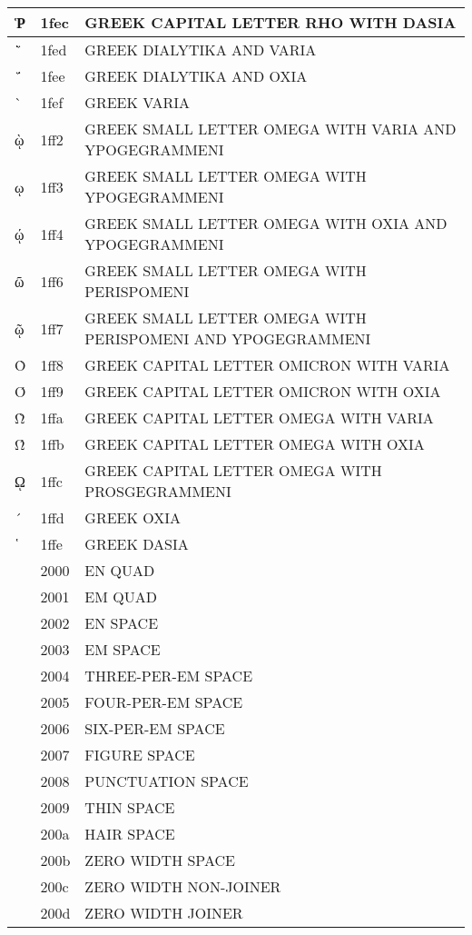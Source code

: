 \documentclass[12pt,letterpaper,openany]{book}
\begin{document}
\begin{center}
\begin{supertabular}{|m{0.25in}|m{0.5in}|m{4in}|}
			Ῥ & 1fec & GREEK CAPITAL LETTER RHO WITH DASIA\\\hline
			῭ & 1fed & GREEK DIALYTIKA AND VARIA\\\hline
			΅ & 1fee & GREEK DIALYTIKA AND OXIA\\\hline
			` & 1fef & GREEK VARIA\\\hline
			ῲ & 1ff2 & GREEK SMALL LETTER OMEGA WITH VARIA AND YPOGEGRAMMENI\\\hline
			ῳ & 1ff3 & GREEK SMALL LETTER OMEGA WITH YPOGEGRAMMENI\\\hline
			ῴ & 1ff4 & GREEK SMALL LETTER OMEGA WITH OXIA AND YPOGEGRAMMENI\\\hline
			ῶ & 1ff6 & GREEK SMALL LETTER OMEGA WITH PERISPOMENI\\\hline
			ῷ & 1ff7 & GREEK SMALL LETTER OMEGA WITH PERISPOMENI AND YPOGEGRAMMENI\\\hline
			Ὸ & 1ff8 & GREEK CAPITAL LETTER OMICRON WITH VARIA\\\hline
			Ό & 1ff9 & GREEK CAPITAL LETTER OMICRON WITH OXIA\\\hline
			Ὼ & 1ffa & GREEK CAPITAL LETTER OMEGA WITH VARIA\\\hline
			Ώ & 1ffb & GREEK CAPITAL LETTER OMEGA WITH OXIA\\\hline
			ῼ & 1ffc & GREEK CAPITAL LETTER OMEGA WITH PROSGEGRAMMENI\\\hline
			´ & 1ffd & GREEK OXIA\\\hline
			῾ & 1ffe & GREEK DASIA\\\hline
			& 2000 & EN QUAD\\\hline
			& 2001 & EM QUAD\\\hline
			& 2002 & EN SPACE\\\hline
			& 2003 & EM SPACE\\\hline
			& 2004 & THREE-PER-EM SPACE\\\hline
			& 2005 & FOUR-PER-EM SPACE\\\hline
			& 2006 & SIX-PER-EM SPACE\\\hline
			& 2007 & FIGURE SPACE\\\hline
			& 2008 & PUNCTUATION SPACE\\\hline
			& 2009 & THIN SPACE\\\hline
			& 200a & HAIR SPACE\\\hline
			​ & 200b & ZERO WIDTH SPACE\\\hline
			‌ & 200c & ZERO WIDTH NON-JOINER\\\hline
			‍ & 200d & ZERO WIDTH JOINER\\\hline

\end{supertabular}
\end{center}
\end{document}
